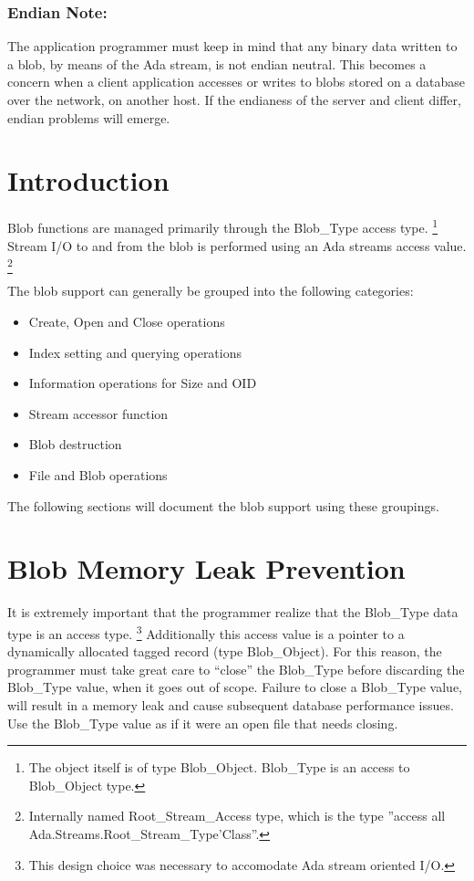\documentclass[english,letterpaper]{book}
\begin{document}
\subsubsection{Endian Note:}

The application programmer must keep in mind that any binary data
written to a blob, by means of the Ada stream, is not endian neutral.
This becomes a concern when a client application accesses or writes
to blobs stored on a database over the network, on another host. If
the endianess of the server and client differ, endian problems will
emerge.


\section{Introduction}

Blob functions are managed primarily through the Blob\_Type access
type.%
\footnote{The object itself is of type Blob\_Object. Blob\_Type is an access
to Blob\_Object type.%
} Stream I/O to and from the blob is performed using an Ada streams
access value.%
\footnote{Internally named Root\_Stream\_Access type, which is the type ''access
all Ada.Streams.Root\_Stream\_Type'Class''.%
} 

The blob support can generally be grouped into the following categories:

\begin{itemize}
   \item Create, Open and Close operations
   \item Index setting and querying operations
   \item Information operations for Size and OID
   \item Stream accessor function
   \item Blob destruction
   \item File and Blob operations
\end{itemize}

The following sections will document the blob support using these
groupings.


\section{Blob Memory Leak Prevention}

It is extremely important that the
programmer realize that the Blob\_Type data type is an access type.%
\footnote{This design choice was necessary to accomodate Ada stream oriented
I/O.%
} Additionally this access value is a pointer to a dynamically allocated
tagged record (type Blob\_Object). For this reason, the programmer
must take great care to ``close'' the Blob\_Type before discarding
the Blob\_Type value, when it goes out of scope. Failure to close
a Blob\_Type value, will result in a memory leak and cause subsequent
database performance issues. Use the Blob\_Type value as if it were
an open file that needs closing.
\end{document}
